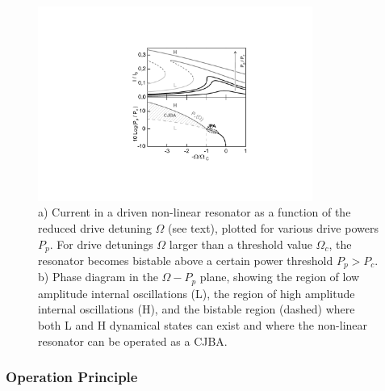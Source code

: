 %
%
 
\begin{figure}	
	\includegraphics[width=9cm]{"./material/figures/introduction/jba_phasediagram"}
	\caption{a) Current in a driven non-linear resonator as a function of the reduced drive detuning $\Omega$ (see text), plotted for various drive powers $P_p$. For drive detunings $\Omega$ larger than a threshold value $\Omega_c$, the resonator becomes bistable above a certain power threshold $P_p>P_c$. b) Phase diagram in the $\Omega-P_p$ plane, showing the region of low amplitude internal oscillations (L), the region  of high amplitude internal oscillations (H), and the bistable region (dashed) where both L and H dynamical states can exist and where the non-linear resonator can be operated as a CJBA.}
	\label{fig:jba_curves}
\end{figure}

\subsubsection{Operation Principle} \label{section:jba_operation_principle}


